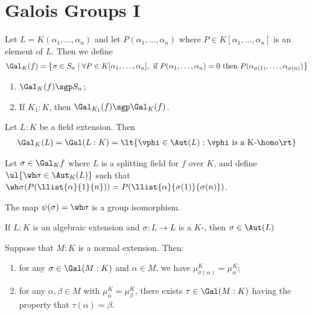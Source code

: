 \documentclass[a4paper]{article}
\begin{document}
\section{Galois Groups I}
\begin{tdefinition}
  Let \( L=K(\alpha_1,\ldots,\alpha_n) \) and let \( P(\alpha_1,\ldots,\alpha_n) \) where \( P\in K[\alpha_1,\ldots,\alpha_n] \) is an element of \( L \).
  Then we define \begin{align*}
    \Gal_K(f)=\left\{\sigma\in S_n\mid \forall P\in K[\alpha_1,\ldots,\alpha_n], \text{ if } P(\alpha_1,\ldots,\alpha_n)=0 \text{ then } P(\alpha_{\sigma(1)},\ldots,\alpha_{\sigma(n)})\right\}
  \end{align*}
\end{tdefinition}

\begin{tlemma}
\begin{enumerate}
  \item \( \Gal_K(f) \sgp S_n \);
  \item If \( K_1:K \), then \( \Gal_{K_1}(f)\sgp \Gal_K(f) \).
\end{enumerate}
\end{tlemma}

\begin{tdefinition}
  Let \( L:K \) be a field extension.
  Then \begin{align*}
    \Gal_K(L) = \Gal(L:K) = \lt\{ \vphi\in\Aut(L) : \vphi\text{ is a K-\homo} \rt\}
  \end{align*}
\end{tdefinition}

\begin{tdefinition}
  Let \( \sigma\in \Gal_K f \) where \( L \) is a splitting field for \( f \) over \( K \), and define \( \ul{\wh\sigma\in\Aut_K(L)} \) such that \( \wh\sigma(P(\llist{\alpha}{1}{n})) = P(\llist{\alpha}{\sigma(1)}{\sigma(n)}) \).
\end{tdefinition}

\begin{tlemma}
  The map \( \psi(\sigma)=\wh\sigma \) is a group isomorphism.
\end{tlemma}

\begin{ttheorem}
  If \( L:K \) is an algebraic extension and \( \sigma:L\to L \) is a \( K \)-\homo, then \( \sigma\in\Aut(L) \)
\end{ttheorem}

\begin{tlemma}
  Suppose that \( M:K \) is a normal extension.
  Then: \begin{enumerate}[label=(\alph*)]
    \item for any \( \sigma\in\Gal(M:K) \) and \( \alpha\in M \), we have \( \mu_{\sigma(\alpha)}^K=\mu_\alpha^K \);
    \item for any \( \alpha,\beta\in M \) with \( \mu_\alpha^K=\mu_\beta^K \), there exists \( \tau\in\Gal(M:K) \) having the property that \( \tau(\alpha)=\beta \).
  \end{enumerate}
\end{tlemma}
\end{document}
